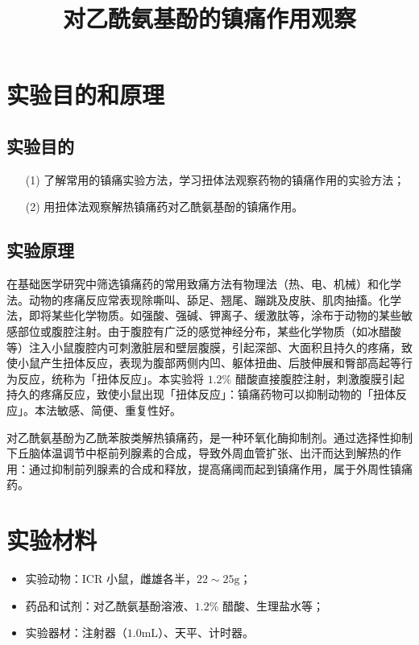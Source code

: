 \documentclass[UTF8]{ctexart}
\title{对乙酰氨基酚的镇痛作用观察}
\author{}
\begin{document}
\date{}
\maketitle

\section{实验目的和原理}

\subsection{实验目的}

\begin{itemize}
    \item [(1)] 了解常用的镇痛实验方法，学习扭体法观察药物的镇痛作用的实验方法；
    \item [(2)] 用扭体法观察解热镇痛药对乙酰氨基酚的镇痛作用。
\end{itemize}

\subsection{实验原理}

在基础医学研究中筛选镇痛药的常用致痛方法有物理法（热、电、机械）和化学法。动物的疼痛反应常表现除嘶叫、舔足、翘尾、蹦跳及皮肤、肌肉抽搐。化学法，即将某些化学物质。如强酸、强碱、钾离子、缓激肽等，涂布于动物的某些敏感部位或腹腔注射。由于腹腔有广泛的感觉神经分布，某些化学物质（如冰醋酸等）注入小鼠腹腔内可刺激脏层和壁层腹膜，引起深部、大面积且持久的疼痛，致使小鼠产生扭体反应，表现为腹部两侧内凹、躯体扭曲、后肢伸展和臀部高起等行为反应，统称为「扭体反应」。本实验将 $1.2\%$ 醋酸直接腹腔注射，刺激腹膜引起持久的疼痛反应，致使小鼠出现「扭体反应」：镇痛药物可以抑制动物的「扭体反应」。本法敏感、简便、重复性好。

对乙酰氨基酚为乙酰苯胺类解热镇痛药，是一种环氧化酶抑制剂。通过选择性抑制下丘脑体温调节中枢前列腺素的合成，导致外周血管扩张、出汗而达到解热的作用：通过抑制前列腺素的合成和释放，提高痛阈而起到镇痛作用，属于外周性镇痛药。

\section{实验材料}

\begin{itemize}
    \item 实验动物：ICR 小鼠，雌雄各半，$22\sim 25\text{g}$；
    \item 药品和试剂：对乙酰氨基酚溶液、$1.2\%$ 醋酸、生理盐水等；
    \item 实验器材：注射器（$1.0\text{mL}$）、天平、计时器。
\end{itemize}
\end{document}
